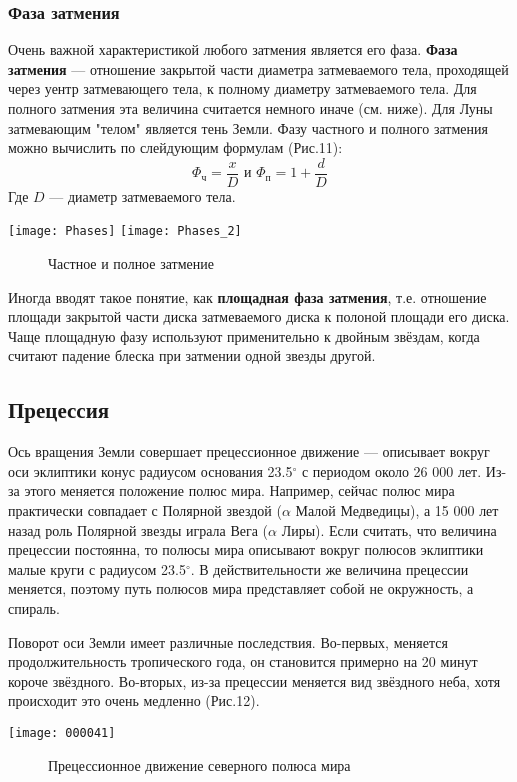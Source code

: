 \documentclass[10pt,a5paper]{article}
\begin{document}
\subsubsection*{Фаза затмения}
Очень важной характеристикой любого затмения является его фаза. \textbf{Фаза затмения} --- отношение закрытой части диаметра затмеваемого тела, проходящей через уентр затмевающего тела, к полному диаметру затмеваемого тела. Для полного затмения эта величина считается немного иначе (см. ниже). Для Луны затмевающим "телом" является тень Земли. Фазу частного и полного затмения можно вычислить по слейдующим формулам (Рис.11):
$$\Phi_{\text{ч}}=\frac{x}{D} \text{ и } \Phi_{\text{п}}=1+\frac{d}{D}$$
Где $D$ --- диаметр затмеваемого тела.
\begin{center}
\texttt{[image: Phases]}
\texttt{[image: Phases\_2]}
\begin{figure}[h!]
\caption{Частное и полное затмение}
\end{figure}
\end{center}

Иногда вводят такое понятие, как \textbf{площадная фаза затмения}, т.е. отношение площади закрытой части диска затмеваемого диска к полоной площади его диска. Чаще площадную фазу используют применительно к двойным звёздам, когда считают падение блеска при затмении одной звезды другой.
\subsection*{Прецессия}

Ось вращения Земли совершает прецессионное движение --- описывает вокруг оси эклиптики  конус радиусом основания 23.5$^\circ$ с периодом около 26 000 лет. Из-за этого меняется положение полюс мира. Например, сейчас полюс мира практически совпадает с Полярной звездой ($\alpha$ Малой Медведицы), а 15 000 лет назад роль Полярной звезды играла Вега ($\alpha$ Лиры). Если считать, что величина прецессии постоянна, то полюсы мира описывают вокруг полюсов эклиптики малые круги с радиусом 23.5$^\circ$. В действительности же величина прецессии меняется, поэтому путь полюсов мира представляет собой не окружность, а спираль.

Поворот оси Земли имеет различные последствия. Во-первых, меняется продолжительность тропического года, он становится примерно на 20 минут короче звёздного. Во-вторых, из-за прецессии меняется вид звёздного неба, хотя происходит это очень медленно (Рис.12).
\begin{center}
\texttt{[image: 000041]}
\begin{figure}[h!]
\caption{Прецессионное движение северного полюса мира}
\end{figure}
\end{center}
\end{document}
